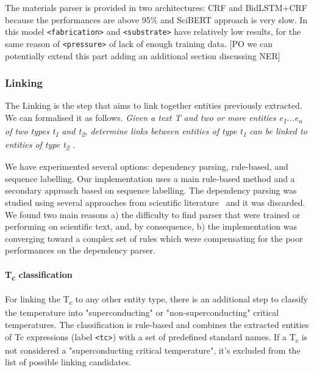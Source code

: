 \documentclass{article}
\begin{document}
The materials parser is provided in two architectures: CRF and BidLSTM+CRF because the performances are above 95\% and SciBERT approach is very slow. 
In this model \texttt{<fabrication>} and \texttt{<substrate>} have relatively low results, for the same reason of \texttt{<pressure>} of lack of enough training data.
[PO we can potentially extend this part adding an additional section discussing NER]

\subsubsection{Linking}

The Linking is the step that aims to link together entities previously extracted.
We can formalised it as follows. \textit{Given a text T and two or more entities e\textsubscript{1}...e\textsubscript{n} of two types t\textsubscript{1} and t\textsubscript{2}, determine links between entities of type t\textsubscript{1} can be linked to entities of type t\textsubscript{2} .} 

We have experimented several options: dependency parsing, rule-based, and sequence labelling. 
Our implementation uses a main rule-based method and a secondary approach based on sequence labelling. The dependency parsing was studied using several approaches from scientific literature~\cite{yoshikawa:2017acl, Tiktinsky2020pyBARTES, swayamdipta:17, zhou-zhao-2019-head} and it was discarded. We found two main reasons a) the difficulty to find parser that were trained or performing on scientific text, and, by consequence, b) the implementation was converging toward a complex set of rules which were compensating for the poor performances on the dependency parser.

\paragraph{T\textsubscript{c} classification}
For linking the T\textsubscript{c} to any other entity type, there is an additional step to classify the temperature into "superconducting" or "non-superconducting" critical temperatures. 
The classification is rule-based and combines the extracted entities of Tc expressions (label \texttt{<tc>}) with a set of predefined standard names. 
If a T\textsubscript{c} is not considered a "superconducting critical temperature", it's excluded from the list of possible linking candidates. 
\end{document}
